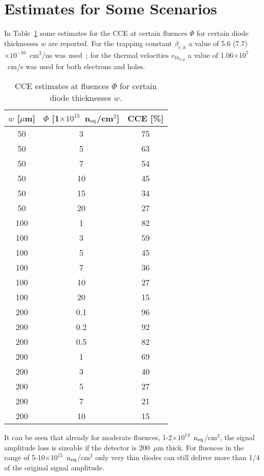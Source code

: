 \section{Estimates for Some Scenarios}

In Table~\ref{tab:cce_scenarios} some estimates for the CCE at certain fluences $\Phi$ for 
certain diode thicknesses $w$ are reported. For  the trapping constant  $\beta_{e,h}$
a value of 5.6 (7.7)$\times 10^{-16}$~cm$^2$/ns was used~\cite{Trapping};  
 for the thermal velocities $v_{th_{n,p}}$ a value of 1.06$\times 10^{7}$~cm/s was used for 
 both electrons and holes.



\begin{table}[!htbp]
\caption{\label{tab:cce_scenarios}CCE estimates at fluences $\Phi$ for 
certain diode thicknesses $w$.}
\centering
\begin{tabular}{ccc}
\hline
$w$ [$\mu$m] & $\Phi$ [1$\times10^{15}$~n$_{\rm eq}$/cm$^2$] & CCE [\%] \\
\hline
\hline
50 & 3 & 75 \\
50 & 5 & 	63 \\
50 & 7 & 54 \\
50 & 	10 & 	45 \\
50 & 15 & 34 \\
50 & 20 & 27\\
\hline
100 & 1 & 82 \\
100 & 3 & 59 \\
100 & 5 & 	45 \\
100 & 7 & 36 \\
100 & 10 & 27 \\
100 & 20 & 15 \\
\hline
200 & 0.1 & 96\\
200 & 0.2 & 92\\
200 & 0.5 & 82\\
200 & 1 & 69 \\
200 & 3 & 40 \\
200 & 5 & 	27 \\
200 & 7 & 21 \\
200 & 10 & 15 \\
\hline
\end{tabular}
\end{table}

It can be seen that already for moderate fluences, 1-2$\times10^{14}$~n$_{\rm eq}$/cm$^2$, 
the signal amplitude loss is sizeable if the detector is 200~$\mu$m thick. 
For fluences in the range of 5-10$\times10^{15}$~n$_{\rm eq}$/cm$^2$ only very thin diodes 
can still deliver more than 1/4 of the original signal amplitude. 

